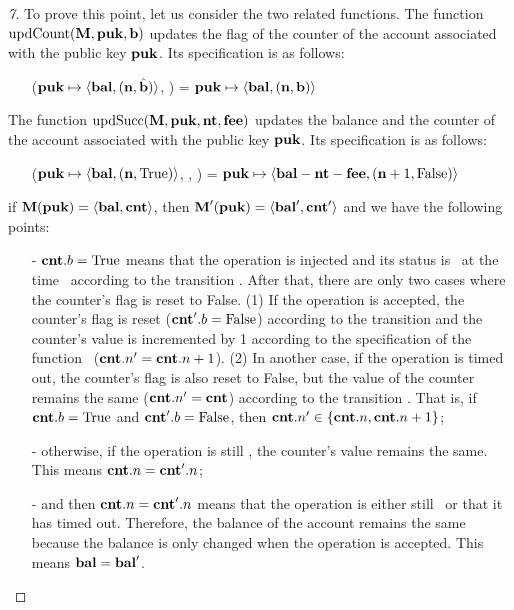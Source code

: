 \documentclass[runningheads]{llncs}
\begin{document}
\begin{proof}[7]To prove this point, let us consider the two related functions. The function $\textup{updCount}(\textbf{M}, \textbf{puk}, \textbf{b})$ updates the flag of the counter of the account associated with the public key $\textbf{puk}$. Its specification is as follows:
 \begin{itemize}
   \item[] \UPDATECOU($\textbf{puk} \mapsto \langle \textbf{bal}, (\textbf{n}, \hat{\textbf{b}}) \rangle$, \BOOLEAN) = $\textbf{puk} \mapsto \langle \textbf{bal}, (\textbf{n}, \textbf{b}) \rangle $
 \end{itemize}
    
    The function $\textup{updSucc}(\textbf{M}, \textbf{puk}, \textbf{nt}, \textbf{fee})$ updates the balance and the counter of the account associated with the public key $\textbf{puk}$. Its specification is as follows:
 \begin{itemize}
   \item[]  \UPDATESUCC($\textbf{puk} \mapsto \langle\textbf{bal}, (\textbf{n}, \text{True})\rangle$, \NTEZ, \MTEZ) = $ \textbf{puk} \mapsto \langle\textbf{bal} - \textbf{nt} - \textbf{fee}, (\textbf{n} + 1, \text{False})\rangle$    
 \end{itemize}
    
\noindent if $\textbf{M} (\textbf{puk}) =
   \langle\textbf{bal}, \textbf{cnt}\rangle$, 
   then $\textbf{M}' (\textbf{puk}) =
   \langle\textbf{bal}', \textbf{cnt}'\rangle$ and we have the following points:
 \begin{itemize}
   \item[-] $\textbf{cnt}.b=\text{True}$ means that the operation is injected and its status is \STATUSPENDING\ at the time \TIME \ according to the transition .  After that, there are only two cases where the counter's flag is reset to False. (1) If the operation is accepted, the counter's flag is reset ($\textbf{cnt}'.b=\text{False}$) according to the transition  and the counter's value is incremented by 1 according to the specification of the function \UPDATESUCC\ ($\textbf{cnt}.n' =\textbf{cnt}.n+1$). (2) In another case, if the operation is timed out, the counter's flag is also reset to False, but the value of the counter remains the same ($\textbf{cnt}.n' =\textbf{cnt}$) according to the transition . That is, if $\textbf{cnt}.b=\text{True}$ and $\textbf{cnt}'.b=\text{False}$, then $\textbf{cnt}.n' \in \{\textbf{cnt}.n, \textbf{cnt}.n+1\}$;
   \item[-] otherwise, if the operation is still \STATUSPENDING, the counter's value remains the same. This means $\textbf{cnt}.n = \textbf{cnt}'.n$; 
   \item[-] and then $\textbf{cnt}.n = \textbf{cnt}'.n$ means that the operation is either still \STATUSPENDING\ or that it has timed out. Therefore, the balance of the account remains the same because the balance is only changed when the operation is accepted. This means $\textbf{bal} = \textbf{bal}'$.
 \end{itemize}
\end{proof}
\end{document}
